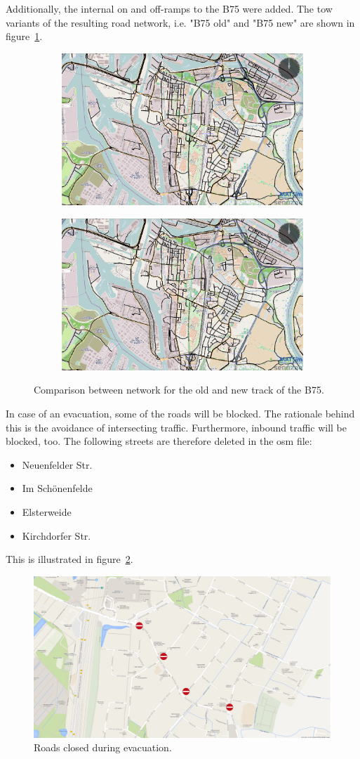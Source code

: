 Additionally, the internal on and off-ramps to the B75 were added. The tow variants of the resulting road network, i.e. "B75 old" and "B75 new" are shown in figure~\ref{fig:b75oldnew}.

\begin{figure}[!ht]
	\begin{subfigure}
		\centering
		\includegraphics[width=.475\linewidth]{extending/figures/Evacuation/b75old}
	\end{subfigure}\hfill
	\begin{subfigure}
		\centering
		\includegraphics[width=.475\linewidth]{extending/figures/Evacuation/b75new}
	\end{subfigure}
	\caption{Comparison between network for the old and new track of the B75.}
	\label{fig:b75oldnew}
\end{figure}

In case of an evacuation, some of the roads will be blocked. The rationale behind this is the avoidance of intersecting traffic. Furthermore, inbound traffic will be blocked, too.
The following streets are therefore deleted in the osm file:
\begin{itemize}
	\item Neuenfelder Str. 
	\item Im Sch\"onenfelde
	\item Elsterweide
	\item Kirchdorfer Str.
\end{itemize}
This is illustrated in figure~\ref{fig:b75sperrung}.
\begin{figure}
	\centering
	\includegraphics[width=0.7\linewidth]{extending/figures/Evacuation/b75sperrung}
	\caption{Roads closed during evacuation.}
	\label{fig:b75sperrung}
\end{figure}

